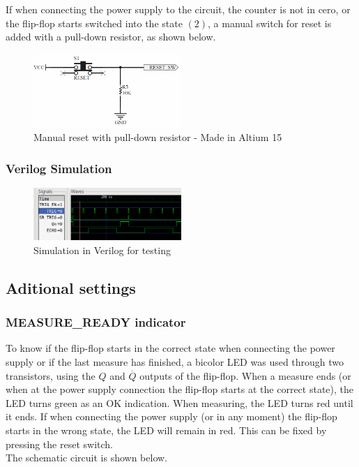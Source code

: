 If when connecting the power supply to the circuit, the counter is not in cero, or the flip-flop starts 
switched into the state $(2)$, a manual switch for reset is added with a pull-down resistor, as shown below.

\begin{figure}[H]
    \begin{centering}
    \includegraphics[width=0.5\textwidth]{data/pullDown_Switch}
    \par\end{centering}
    \caption{Manual reset with pull-down resistor - Made in Altium 15}
\end{figure}

\subsubsection*{Verilog Simulation}
\begin{figure}[H]
    \begin{centering}
    \includegraphics[width=0.5\textwidth]{data/trigger_enable}
    \par\end{centering}
    \caption{Simulation in Verilog for testing}
\end{figure}


\subsection*{Aditional settings}
\subsubsection*{MEASURE\_READY indicator}

To know if the flip-flop starts in the correct state when connecting the power supply or 
if the last measure has finished, 
a bicolor LED was used through two transistors, using the $Q$ and $\overline{Q}$ outputs 
of the flip-flop. When a measure ends (or when at the power supply connection the flip-flop starts
at the correct state), the LED turns green as an OK indication. When measuring, the LED turns red until
it ends. If when connecting the power supply (or in any moment) the flip-flop starts in the 
wrong state, the LED will remain in red. This can be fixed by pressing the reset switch.\\
The schematic circuit is shown below.

